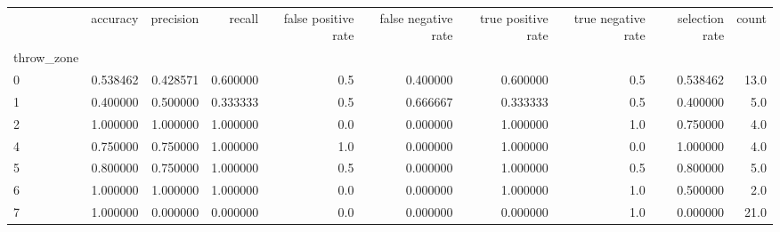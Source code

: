 \begin{tabular}{lrrrrrrrrr}
\toprule
{} &  accuracy &  precision &    recall &  false positive rate &  false negative rate &  true positive rate &  true negative rate &  selection rate &  count \\
throw\_zone &           &            &           &                      &                      &                     &                     &                 &        \\
\midrule
0          &  0.538462 &   0.428571 &  0.600000 &                  0.5 &             0.400000 &            0.600000 &                 0.5 &        0.538462 &   13.0 \\
1          &  0.400000 &   0.500000 &  0.333333 &                  0.5 &             0.666667 &            0.333333 &                 0.5 &        0.400000 &    5.0 \\
2          &  1.000000 &   1.000000 &  1.000000 &                  0.0 &             0.000000 &            1.000000 &                 1.0 &        0.750000 &    4.0 \\
4          &  0.750000 &   0.750000 &  1.000000 &                  1.0 &             0.000000 &            1.000000 &                 0.0 &        1.000000 &    4.0 \\
5          &  0.800000 &   0.750000 &  1.000000 &                  0.5 &             0.000000 &            1.000000 &                 0.5 &        0.800000 &    5.0 \\
6          &  1.000000 &   1.000000 &  1.000000 &                  0.0 &             0.000000 &            1.000000 &                 1.0 &        0.500000 &    2.0 \\
7          &  1.000000 &   0.000000 &  0.000000 &                  0.0 &             0.000000 &            0.000000 &                 1.0 &        0.000000 &   21.0 \\
\bottomrule
\end{tabular}
